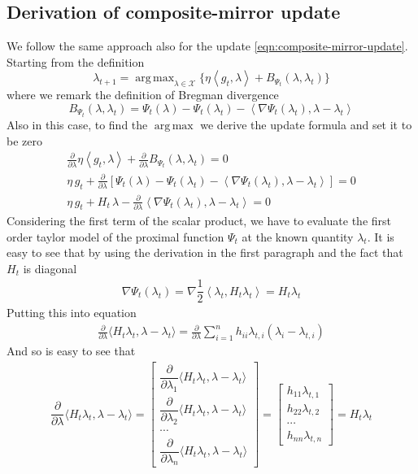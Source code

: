 \documentclass[notitlepage]{article}
\DeclareMathOperator*{\argmax}{arg\,max}
\begin{document}
\subsection{Derivation of composite-mirror update}
We follow the same approach also for the update \eqref{eqn:composite-mirror-update}. Starting from the definition
\[
  \lambda_{t+1} = \argmax_{\lambda \in \mathcal{X}} \{ \eta \left\langle g_t,\lambda \right\rangle + B_{\Psi_t} (\lambda,\lambda_t) \}
\]
where we remark the definition of Bregman divergence
\[
  B_{\Psi_t} (\lambda,\lambda_t) = \Psi_t(\lambda) - \Psi_t(\lambda_t) - \left\langle \nabla \Psi_t(\lambda_t),\lambda-\lambda_t \right\rangle  
\]
Also in this case, to find the $\argmax$ we derive the update formula and set it to be zero
\begin{align*}
  \frac{\partial}{\partial \lambda} \eta \left\langle g_t,\lambda \right\rangle + \frac{\partial}{\partial \lambda} B_{\Psi_t} (\lambda,\lambda_t) = 0 \\ 
  \eta\, g_t + \frac{\partial}{\partial \lambda} \left[ \Psi_t(\lambda) - \Psi_t(\lambda_t) - \left\langle \nabla \Psi_t(\lambda_t),\lambda-\lambda_t \right\rangle \right] = 0 \\
  \eta\, g_t + H_t\, \lambda - \frac{\partial}{\partial \lambda} \left\langle \nabla \Psi_t(\lambda_t),\lambda-\lambda_t \right\rangle = 0
\end{align*}
Considering the first term of the scalar product, we have to evaluate the first order taylor model of the proximal function $\Psi_t$ at the
known quantity $\lambda_t$. It is easy to see that by using the derivation in the first paragraph and the fact that $H_t$ is diagonal
\begin{align*}
  \nabla \Psi_t(\lambda_t) = \nabla \dfrac{1}{2} \left\langle \lambda_t, H_t \lambda_t \right\rangle = H_t \lambda_t
\end{align*}
Putting this into equation
\begin{align*}
  \frac{\partial}{\partial \lambda} \langle H_t \lambda_t, \lambda - \lambda_t \rangle = \frac{\partial}{\partial \lambda} \sum_{i=1}^n h_{ii} \lambda_{t,i} (\lambda_i - \lambda_{t,i})
\end{align*}
And so is easy to see that
\begin{align*}
  \dfrac{\partial}{\partial \lambda} \langle H_t \lambda_t, \lambda - \lambda_t \rangle = 
  \begin{bmatrix}
    \dfrac{\partial}{\partial \lambda_1} \langle H_t \lambda_t, \lambda - \lambda_t \rangle \\[3ex]
    \dfrac{\partial}{\partial \lambda_2} \langle H_t \lambda_t, \lambda - \lambda_t \rangle \\[3ex]
    \cdots \\[3ex]
    \dfrac{\partial}{\partial \lambda_n} \langle H_t \lambda_t, \lambda - \lambda_t \rangle
  \end{bmatrix} 
  =
  \begin{bmatrix}
    h_{11} \lambda_{t,1} \\[2ex]
    h_{22} \lambda_{t,2} \\[2ex]
    \cdots \\[2ex]
    h_{nn} \lambda_{t,n}
  \end{bmatrix}
  = 
  H_t \lambda_t
\end{align*} 
\end{document}

